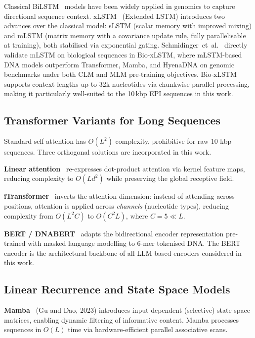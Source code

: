 Classical BiLSTM~\cite{lstm} models have been widely applied in genomics to capture
directional sequence context.
xLSTM~\cite{xlstm} (Extended LSTM) introduces two advances over the classical model:
sLSTM (scalar memory with improved mixing) and mLSTM (matrix memory with a covariance
update rule, fully parallelisable at training), both stabilised via exponential gating.
Schmidinger~et~al.~\cite{bioxlstm} directly validate mLSTM on biological sequences
in Bio-xLSTM, where mLSTM-based DNA models outperform Transformer, Mamba, and HyenaDNA
on genomic benchmarks under both CLM and MLM pre-training objectives.
Bio-xLSTM supports context lengths up to 32k nucleotides via chunkwise parallel
processing, making it particularly well-suited to the 10\,kbp EPI sequences in this work.

\subsection{Transformer Variants for Long Sequences}

Standard self-attention has $O(L^2)$ complexity, prohibitive for raw 10 kbp sequences.
Three orthogonal solutions are incorporated in this work.

\textbf{Linear attention}~\cite{linear_transformer} re-expresses dot-product attention
via kernel feature maps, reducing complexity to $O(Ld^2)$ while preserving the global
receptive field.

\textbf{iTransformer}~\cite{itransformer} inverts the attention dimension: instead of
attending across positions, attention is applied across \emph{channels} (nucleotide
types), reducing complexity from $O(L^2 C)$ to $O(C^2 L)$, where $C = 5 \ll L$.

\textbf{BERT / DNABERT}~\cite{dnabert} adapts the bidirectional encoder representation
pre-trained with masked language modelling to 6-mer tokenised DNA.
The BERT encoder is the architectural backbone of all LLM-based encoders considered
in this work.

\subsection{Linear Recurrence and State Space Models}

\textbf{Mamba}~\cite{mamba} (Gu and Dao, 2023) introduces input-dependent (selective)
state space matrices, enabling dynamic filtering of informative content.
Mamba processes sequences in $O(L)$ time via hardware-efficient parallel associative
scans.


